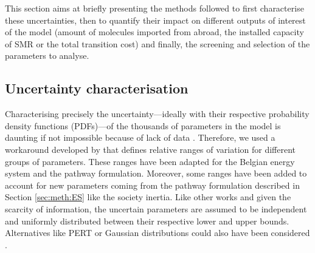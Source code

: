 This section aims at briefly presenting the methods followed to first characterise these uncertainties, then to quantify their impact on different outputs of interest of the model (\eg amount of molecules imported from abroad, the installed capacity of \gls{SMR} or the total transition cost) and finally, the screening and selection of the parameters to analyse.

\subsection{Uncertainty characterisation}
\label{subsec:uncert_charac}
Characterising precisely the uncertainty---ideally with their respective probability density functions (PDFs)---of the thousands of parameters in the model is daunting if not impossible because of lack of data \cite{marnay2006addressing}. Therefore, we used a workaround developed by \citet{Moret2017} that defines relative ranges of variation for different groups of parameters. These ranges have been adapted for the Belgian energy system and the pathway formulation. Moreover, some ranges have been added to account for new parameters coming from the pathway formulation described in Section \ref{sec:meth:ES} like the society inertia. Like other works \cite{li2019renewables,coppitters2021robust,Moret2017PhDThesis} and given the scarcity of information, the uncertain parameters are assumed to be independent and uniformly distributed between their respective lower and upper bounds. Alternatives like PERT or Gaussian distributions could also have been considered \cite{coppittersthesis}.



